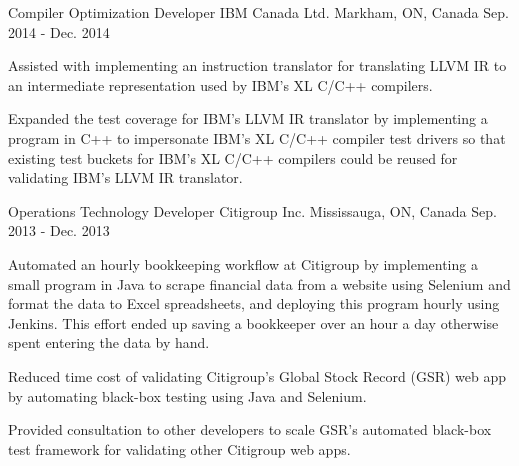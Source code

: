 

\begin{cventries}

  \cventry
    {Compiler Optimization Developer} %
    {IBM Canada Ltd.} %
    {Markham, ON, Canada} %
    {Sep. 2014 - Dec. 2014} %
    {
      \begin{cvitems} %
        \item {
          Assisted with implementing an instruction translator for translating LLVM IR to an
          intermediate representation used by IBM's XL C/C++ compilers.
        }
        \item {
          Expanded the test coverage for IBM's LLVM IR translator by implementing a program in C++
          to impersonate IBM's XL C/C++ compiler test drivers so that existing test buckets for
          IBM's XL C/C++ compilers could be reused for validating IBM's LLVM IR translator.
        }
      \end{cvitems}
    }

  \cventry
    {Operations Technology Developer} %
    {Citigroup Inc.} %
    {Mississauga, ON, Canada} %
    {Sep. 2013 - Dec. 2013} %
    {
      \begin{cvitems} %
        \item {
          Automated an hourly bookkeeping workflow at Citigroup by implementing a small program in
          Java to scrape financial data from a website using Selenium and format the data to Excel
          spreadsheets, and deploying this program hourly using Jenkins. This effort ended up
          saving a bookkeeper over an hour a day otherwise spent entering the data by hand.
        }
        \item {
          Reduced time cost of validating Citigroup's Global Stock Record (GSR) web app by
          automating black-box testing using Java and Selenium.
        }
        \item {
          Provided consultation to other developers to scale GSR's automated black-box test
          framework for validating other Citigroup web apps.
        }
      \end{cvitems}
    }


\end{cventries}
